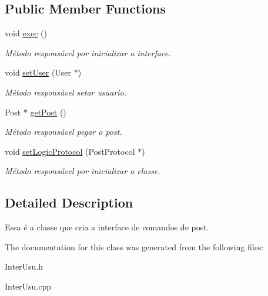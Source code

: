 \subsection*{Public Member Functions}
\begin{DoxyCompactItemize}
\item 
\hypertarget{class_post_controler_a4efc16938c3ca876209f780b328281ba}{void \hyperlink{class_post_controler_a4efc16938c3ca876209f780b328281ba}{exec} ()}\label{class_post_controler_a4efc16938c3ca876209f780b328281ba}

\begin{DoxyCompactList}\small\item\em Método responsável por inicializar a interface. \end{DoxyCompactList}\item 
\hypertarget{class_post_controler_ac678a38c6e956c00b595224e366e1db7}{void \hyperlink{class_post_controler_ac678a38c6e956c00b595224e366e1db7}{set\-User} (User $\ast$)}\label{class_post_controler_ac678a38c6e956c00b595224e366e1db7}

\begin{DoxyCompactList}\small\item\em Método responsável setar usuario. \end{DoxyCompactList}\item 
\hypertarget{class_post_controler_adf9167af1d789a53824bd5fda74017ad}{Post $\ast$ \hyperlink{class_post_controler_adf9167af1d789a53824bd5fda74017ad}{get\-Post} ()}\label{class_post_controler_adf9167af1d789a53824bd5fda74017ad}

\begin{DoxyCompactList}\small\item\em Método responsável pegar o post. \end{DoxyCompactList}\item 
\hypertarget{class_post_controler_a6a1ce212839f2dad093a728cde58afce}{void \hyperlink{class_post_controler_a6a1ce212839f2dad093a728cde58afce}{set\-Logic\-Protocol} (Post\-Protocol $\ast$)}\label{class_post_controler_a6a1ce212839f2dad093a728cde58afce}

\begin{DoxyCompactList}\small\item\em Método responsável por inicializar a classe. \end{DoxyCompactList}\end{DoxyCompactItemize}


\subsection{Detailed Description}
Essa é a classe que cria a interface de comandos de post. 

The documentation for this class was generated from the following files\-:\begin{DoxyCompactItemize}
\item 
Inter\-Usu.\-h\item 
Inter\-Usu.\-cpp\end{DoxyCompactItemize}
